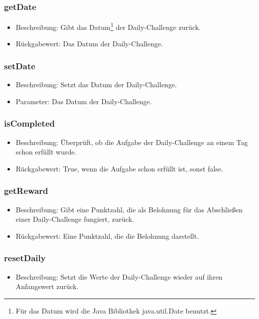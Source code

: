 \documentclass[a4paper]{scrreprt}
\begin{document}
	\subsubsection{getDate}
	\begin{itemize}
		\item Beschreibung: Gibt das Datum\footnote{Für das Datum wird die Java Bibliothek java.util.Date benutzt.} der Daily-Challenge zurück.
		\item Rückgabewert: Das Datum der Daily-Challenge.
	\end{itemize}
	\subsubsection{setDate}
	\begin{itemize}
		\item Beschreibung: Setzt das Datum der Daily-Challenge.
		\item Parameter: Das Datum der Daily-Challenge.
	\end{itemize}
	\subsubsection{isCompleted}
	\begin{itemize}
		\item Beschreibung: Überprüft, ob die Aufgabe der Daily-Challenge an einem Tag schon erfüllt wurde.
		\item Rückgabewert: True, wenn die Aufgabe schon erfüllt ist, sonst false.
	\end{itemize}
	\subsubsection{getReward}
	\begin{itemize}
		\item Beschreibung: Gibt eine Punktzahl, die als Belohnung für das Abschließen einer Daily-Challenge fungiert, zurück.
		\item Rückgabewert: Eine Punktzahl, die die Belohnung darstellt.
	\end{itemize}
	\subsubsection{resetDaily}
	\begin{itemize}
		\item Beschreibung: Setzt die Werte der Daily-Challenge wieder auf ihren Anfangswert zurück.
	\end{itemize}
\end{document}
